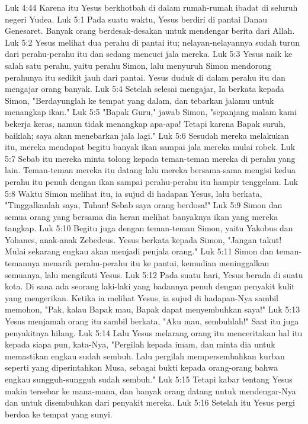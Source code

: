 Luk 4:44  Karena itu Yesus berkhotbah di dalam rumah-rumah ibadat di seluruh negeri Yudea.
Luk 5:1  Pada suatu waktu, Yesus berdiri di pantai Danau Genesaret. Banyak orang berdesak-desakan untuk mendengar berita dari Allah.
Luk 5:2  Yesus melihat dua perahu di pantai itu; nelayan-nelayannya sudah turun dari perahu-perahu itu dan sedang mencuci jala mereka.
Luk 5:3  Yesus naik ke salah satu perahu, yaitu perahu Simon, lalu menyuruh Simon mendorong perahunya itu sedikit jauh dari pantai. Yesus duduk di dalam perahu itu dan mengajar orang banyak.
Luk 5:4  Setelah selesai mengajar, Ia berkata kepada Simon, "Berdayunglah ke tempat yang dalam, dan tebarkan jalamu untuk menangkap ikan."
Luk 5:5  "Bapak Guru," jawab Simon, "sepanjang malam kami bekerja keras, namun tidak menangkap apa-apa! Tetapi karena Bapak suruh, baiklah; saya akan menebarkan jala lagi."
Luk 5:6  Sesudah mereka melakukan itu, mereka mendapat begitu banyak ikan sampai jala mereka mulai robek.
Luk 5:7  Sebab itu mereka minta tolong kepada teman-teman mereka di perahu yang lain. Teman-teman mereka itu datang lalu mereka bersama-sama mengisi kedua perahu itu penuh dengan ikan sampai perahu-perahu itu hampir tenggelam.
Luk 5:8  Waktu Simon melihat itu, ia sujud di hadapan Yesus, lalu berkata, "Tinggalkanlah saya, Tuhan! Sebab saya orang berdosa!"
Luk 5:9  Simon dan semua orang yang bersama dia heran melihat banyaknya ikan yang mereka tangkap.
Luk 5:10  Begitu juga dengan teman-teman Simon, yaitu Yakobus dan Yohanes, anak-anak Zebedeus. Yesus berkata kepada Simon, "Jangan takut! Mulai sekarang engkau akan menjadi penjala orang."
Luk 5:11  Simon dan teman-temannya menarik perahu-perahu itu ke pantai, kemudian meninggalkan semuanya, lalu mengikuti Yesus.
Luk 5:12  Pada suatu hari, Yesus berada di suatu kota. Di sana ada seorang laki-laki yang badannya penuh dengan penyakit kulit yang mengerikan. Ketika ia melihat Yesus, ia sujud di hadapan-Nya sambil memohon, "Pak, kalau Bapak mau, Bapak dapat menyembuhkan saya!"
Luk 5:13  Yesus menjamah orang itu sambil berkata, "Aku mau, sembuhlah!" Saat itu juga penyakitnya hilang.
Luk 5:14  Lalu Yesus melarang orang itu menceritakan hal itu kepada siapa pun, kata-Nya, "Pergilah kepada imam, dan minta dia untuk memastikan engkau sudah sembuh. Lalu pergilah mempersembahkan kurban seperti yang diperintahkan Musa, sebagai bukti kepada orang-orang bahwa engkau sungguh-sungguh sudah sembuh."
Luk 5:15  Tetapi kabar tentang Yesus makin tersebar ke mana-mana, dan banyak orang datang untuk mendengar-Nya dan untuk disembuhkan dari penyakit mereka.
Luk 5:16  Setelah itu Yesus pergi berdoa ke tempat yang sunyi.
